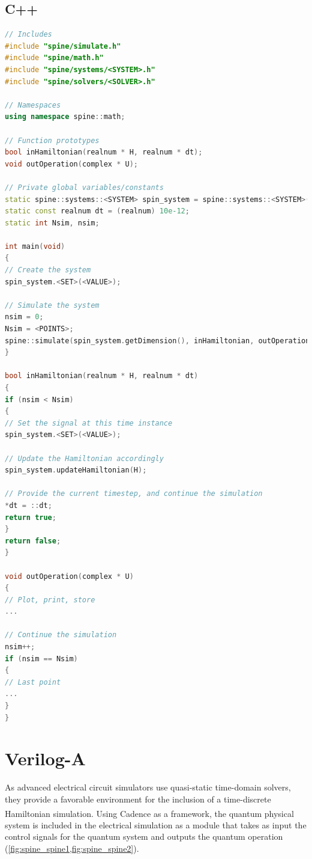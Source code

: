 \documentclass[10pt,a4paper,onecolumn,notitlepage]{article}
\begin{document}
\subsection{C++}
\begin{lstlisting}[language=C++]
// Includes
#include "spine/simulate.h"
#include "spine/math.h"
#include "spine/systems/<SYSTEM>.h"
#include "spine/solvers/<SOLVER>.h"

// Namespaces
using namespace spine::math;

// Function prototypes
bool inHamiltonian(realnum * H, realnum * dt);
void outOperation(complex * U);

// Private global variables/constants
static spine::systems::<SYSTEM> spin_system = spine::systems::<SYSTEM>();
static const realnum dt = (realnum) 10e-12;
static int Nsim, nsim;

int main(void)
{
// Create the system
spin_system.<SET>(<VALUE>);

// Simulate the system
nsim = 0;
Nsim = <POINTS>;
spine::simulate(spin_system.getDimension(), inHamiltonian, outOperation, spine::solvers::<SOLVER>);
}

bool inHamiltonian(realnum * H, realnum * dt)
{
if (nsim < Nsim)
{
// Set the signal at this time instance
spin_system.<SET>(<VALUE>);

// Update the Hamiltonian accordingly
spin_system.updateHamiltonian(H);

// Provide the current timestep, and continue the simulation
*dt = ::dt;
return true;
}
return false;
}

void outOperation(complex * U)
{
// Plot, print, store
...

// Continue the simulation
nsim++;
if (nsim == Nsim)
{
// Last point
...
}
}
\end{lstlisting}

\section{Verilog-A}
\label{sec:veriloga}
As advanced electrical circuit simulators use quasi-static time-domain solvers, they provide a favorable environment for the inclusion of a time-discrete Hamiltonian simulation. Using Cadence\textsuperscript{\textregistered} as a framework, the quantum physical system is included in the electrical simulation as a module that takes as input the control signals for the quantum system and outputs the quantum operation (\cref{fig:spine_spine1,fig:spine_spine2}).
\end{document}
